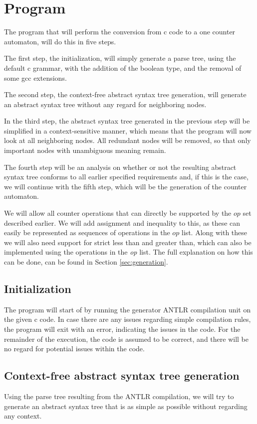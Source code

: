 \documentclass[12pt]{article}
\begin{document}
\section{Program}
The program that will perform the conversion from c code to a one counter automaton, will do this in five steps.

The first step, the initialization, will simply generate a parse tree, using the default c grammar, with the addition of the boolean type, and the removal of some gcc extensions.

The second step, the context-free abstract syntax tree generation, will generate an abstract syntax tree without any regard for neighboring nodes.

In the third step, the abstract syntax tree generated in the previous step will be simplified in a context-sensitive manner, which means that the program will now look at all neighboring nodes. All redundant nodes will be removed, so that only important nodes with unambiguous meaning remain.

The fourth step will be an analysis on whether or not the resulting abstract syntax tree conforms to all earlier specified requirements and, if this is the case, we will continue with the fifth step, which will be the generation of the counter automaton.

We will allow all counter operations that can directly be supported by the $op$ set described earlier. We will add assignment and inequality to this, as these can easily be represented as sequences of operations in the $op$ list. Along with these we will also need support for strict less than and greater than, which can also be implemented using the operations in the \textit{op} list. The full explanation on how this can be done, can be found in Section \ref{sec:generation}.

\subsection{Initialization}
The program will start of by running the generator ANTLR compilation unit on the given c code. In case there are any issues regarding simple compilation rules, the program will exit with an error, indicating the issues in the code. For the remainder of the execution, the code is assumed to be correct, and there will be no regard for potential issues within the code.

\subsection{Context-free abstract syntax tree generation}
Using the parse tree resulting from the ANTLR compilation, we will try to generate an abstract syntax tree that is as simple as possible without regarding any context. 
\end{document}
